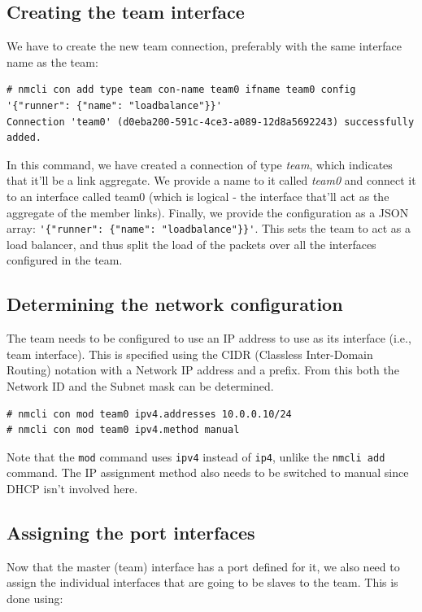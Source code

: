 \subsection{Creating the team interface}
We have to create the new team connection, preferably with the same interface name as the team:

\vspace{-15pt}
\begin{verbatim}
# nmcli con add type team con-name team0 ifname team0 config '{"runner": {"name": "loadbalance"}}'
Connection 'team0' (d0eba200-591c-4ce3-a089-12d8a5692243) successfully added.
\end{verbatim}
\vspace{-10pt}	

\noindent
In this command, we have created a connection of type \textit{team}, which indicates that it'll be a link aggregate. We provide a name to it called \textit{team0} and connect it to an interface called team0 (which is logical - the interface that'll act as the aggregate of the member links). Finally, we provide the configuration as a JSON array: \verb|'{"runner": {"name": "loadbalance"}}'|. This sets the team to act as a load balancer, and thus split the load of the packets over all the interfaces configured in the team. 

\subsection{Determining the network configuration}
The team needs to be configured to use an IP address to use as its interface (i.e., team interface). This is specified using the CIDR (Classless Inter-Domain Routing) notation with a Network IP address and a prefix. From this both the Network ID and the Subnet mask can be determined. 

\vspace{-15pt}
\begin{verbatim}
# nmcli con mod team0 ipv4.addresses 10.0.0.10/24
# nmcli con mod team0 ipv4.method manual
\end{verbatim}
\vspace{-10pt}	

\noindent
Note that the \verb|mod| command uses \verb|ipv4| instead of \verb|ip4|, unlike the \verb|nmcli add| command. The IP assignment method also needs to be switched to manual since DHCP isn't involved here. 

\subsection{Assigning the port interfaces}
Now that the master (team) interface has a port defined for it, we also need to assign the individual interfaces that are going to be slaves to the team. This is done using:

